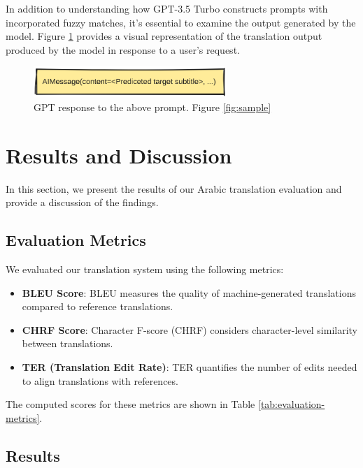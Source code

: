 \documentclass[12pt]{article}
\begin{document}
In addition to understanding how GPT-3.5 Turbo constructs prompts with incorporated fuzzy matches, it's essential to examine the output generated by the model. Figure \ref{fig:gpt_output} provides a visual representation of the translation output produced by the model in response to a user's request.

\begin{figure}[h]
	\centering
	\includegraphics[width=0.65\textwidth]{assets/gpt_response.png}
	\caption{GPT response to the above prompt. Figure \ref{fig:sample}}
	\label{fig:gpt_output}
\end{figure}


\section{Results and Discussion}

\label{sec:results}

In this section, we present the results of our Arabic translation evaluation and provide a discussion of the findings.

\subsection{Evaluation Metrics}

We evaluated our translation system using the following metrics:

\begin{itemize}
	\item \textbf{BLEU Score}: BLEU measures the quality of machine-generated translations compared to reference translations.
	\item \textbf{CHRF Score}: Character F-score (CHRF) considers character-level similarity between translations.
	\item \textbf{TER (Translation Edit Rate)}: TER quantifies the number of edits needed to align translations with references.
\end{itemize}

The computed scores for these metrics are shown in Table \ref{tab:evaluation-metrics}.

\subsection{Results}
\end{document}
